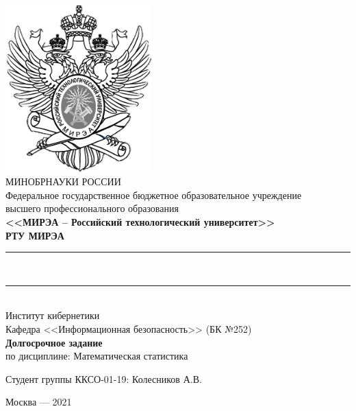\thispagestyle{empty}
~\vspace{-2cm}\setlength{\parindent}{0cm}
\begin{center}
	\includegraphics[scale=1.5]{../include/logo.png}\\[2pt]
	МИНОБРНАУКИ РОССИИ\\
	Федеральное государственное бюджетное образовательное учреждение\\
	высшего профессионального образования\\[5pt]
	\textbf{<<МИРЭА – Российский технологический университет>>}\\[5pt]
	\textbf{\large РТУ МИРЭА}\\[20pt]
	\hrule{}\mbox{}\\[1pt]
	\hrule{}\mbox{}\\[20pt]	
	Институт кибернетики \\ Кафедра <<Информационная безопасность>> (БК №252)\\[35pt]
	\textbf{Долгосрочное задание} \\
	по дисциплине: Математическая статистика
\end{center}
	\vspace{4in}
	Студент группы ККСО-01-19:  \qquad \qquad \qquad  \qquad     Колесников А.В.
\vspace{0.6in}
\begin{center}
Москва --- 2021
\end{center}
\newpage